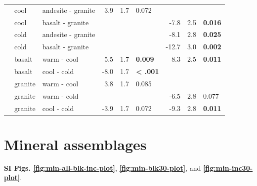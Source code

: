 \documentclass[english,man,floatsintext]{apa6}
\begin{document}
\begin{longtable}[t]{lllrrlrrl}
\nopagebreak
 & cool & andesite - granite & 3.9 & 1.7 & 0.072 &  &  & \\
\nopagebreak
 & cool & basalt - granite &  &  &  & -7.8 & 2.5 & \textbf{0.016}\\
\nopagebreak
 & cold & andesite - granite &  &  &  & -8.1 & 2.8 & \textbf{0.025}\\
\nopagebreak
 & cold & basalt - granite &  &  &  & -12.7 & 3.0 & \textbf{0.002}\\
\nopagebreak
 & basalt & warm - cool & 5.5 & 1.7 & \textbf{0.009} & 8.3 & 2.5 & \textbf{0.011}\\
\nopagebreak
 & basalt & cool - cold & -8.0 & 1.7 & \textbf{< .001} &  &  & \\
\nopagebreak
 & granite & warm - cool & 3.8 & 1.7 & 0.085 &  &  & \\
\nopagebreak
 & granite & warm - cold &  &  &  & -6.5 & 2.8 & 0.077\\
\nopagebreak
\multirow[t]{-10}{*}{\raggedright\arraybackslash 20-30cm} & granite & cool - cold & -3.9 & 1.7 & 0.072 & -9.3 & 2.8 & \textbf{0.011}\\*
\end{longtable}
\endgroup{}

\hypertarget{mineral-assemblages}{%
\section{Mineral assemblages}\label{mineral-assemblages}}

\textbf{SI Figs. \ref{fig:min-all-blk-inc-plot}}, \textbf{\ref{fig:min-blk30-plot}}, and \textbf{\ref{fig:min-inc30-plot}}.
\end{document}
